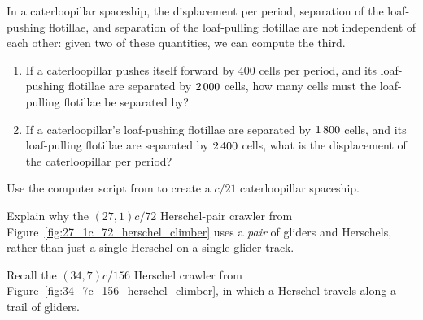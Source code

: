 \begin{multicols}{2}
\mfilbreak


\begin{problem}\label{exer:caterloopillar_calc_flotillae_spacing}
	In a caterloopillar spaceship, the displacement per period, separation of the loaf-pushing flotillae, and separation of the loaf-pulling flotillae are not independent of each other: given two of these quantities, we can compute the third.\smallskip
	
	\begin{enumerate}[label=\bf\color{ocre}(\alph*)]
		\item If a caterloopillar pushes itself forward by $400$ cells per period, and its loaf-pushing flotillae are separated by $2{\,}000$ cells, how many cells must the loaf-pulling flotillae be separated by?
		
		\item If a caterloopillar's loaf-pushing flotillae are separated by $1{\,}800$ cells, and its loaf-pulling flotillae are separated by $2{\,}400$ cells, what is the displacement of the caterloopillar per period?
	\end{enumerate}
\end{problem}


\mfilbreak


\begin{problem}\label{exer:caterloopillar_make_via_script}
	Use the computer script from  to create a $c/21$ caterloopillar spaceship.
\end{problem}


\mfilbreak


\begin{problem}\label{exer:27_1c_72_why_two}
	Explain why the $(27,1)c/72$ Herschel-pair crawler from Figure~\ref{fig:27_1c_72_herschel_climber} uses a \emph{pair} of gliders and Herschels, rather than just a single Herschel on a single glider track.
\end{problem}


\mfilbreak


\begin{problemstar}\label{exer:34_7c_156_with_blocks}
	Recall the $(34,7)c/156$ Herschel crawler from Figure~\ref{fig:34_7c_156_herschel_climber}, in which a Herschel travels along a trail of gliders.\smallskip
	

\end{problemstar}
\end{multicols}
